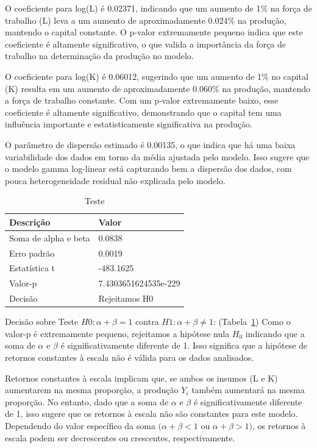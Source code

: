 \documentclass[
  letterpaper,
  DIV=11,
  numbers=noendperiod]{scrreprt}
\begin{document}
O coeficiente para log(L) é 0.02371, indicando que um aumento de 1\% na
força de trabalho (L) leva a um aumento de aproximadamente 0.024\% na
produção, mantendo o capital constante. O p-valor extremamente pequeno
indica que este coeficiente é altamente significativo, o que valida a
importância da força de trabalho na determinação da produção no modelo.

O coeficiente para log(K) é 0.06012, sugerindo que um aumento de 1\% no
capital (K) resulta em um aumento de aproximadamente 0.060\% na
produção, mantendo a força de trabalho constante. Com um p-valor
extremamente baixo, esse coeficiente é altamente significativo,
demonstrando que o capital tem uma influência importante e
estatisticamente significativa na produção.

O parâmetro de dispersão estimado é 0.00135, o que indica que há uma
baixa variabilidade dos dados em torno da média ajustada pelo modelo.
Isso sugere que o modelo gamma log-linear está capturando bem a
dispersão dos dados, com pouca heterogeneidade residual não explicada
pelo modelo.

\begin{longtable}[]{@{}ll@{}}

\caption{\label{tbl-teste}Teste}

\tabularnewline

\toprule\noalign{}
Descrição & Valor \\
\midrule\noalign{}
\endhead
\bottomrule\noalign{}
\endlastfoot
Soma de alpha e beta & 0.0838 \\
Erro padrão & 0.0019 \\
Estatística t & -483.1625 \\
Valor-p & 7.4303651624535e-229 \\
Decisão & Rejeitamos H0 \\

\end{longtable}

Decisão sobre Teste \(𝐻0 : 𝛼 + 𝛽 = 1\) contra \(𝐻1 : 𝛼 + 𝛽 ≠ 1\):
(Tabela~\ref{tbl-teste}) Como o valor-p é extremamente pequeno,
rejeitamos a hipótese nula \(H_0\) indicando que a soma de \(\alpha\) e
\(\beta\) é significativamente diferente de 1. Isso significa que a
hipótese de retornos constantes à escala não é válida para os dados
analisados.

Retornos constantes à escala implicam que, se ambos os insumos (L e K)
aumentarem na mesma proporção, a produção \(Y_i\) também aumentará na
mesma proporção. No entanto, dado que a soma de \(\alpha\) e \(\beta\) é
significativamente diferente de 1, isso sugere que os retornos à escala
não são constantes para este modelo. Dependendo do valor específico da
soma \((\alpha + \beta < 1\) ou \(\alpha + \beta > 1)\), os retornos à
escala podem ser decrescentes ou crescentes, respectivamente.
\end{document}
